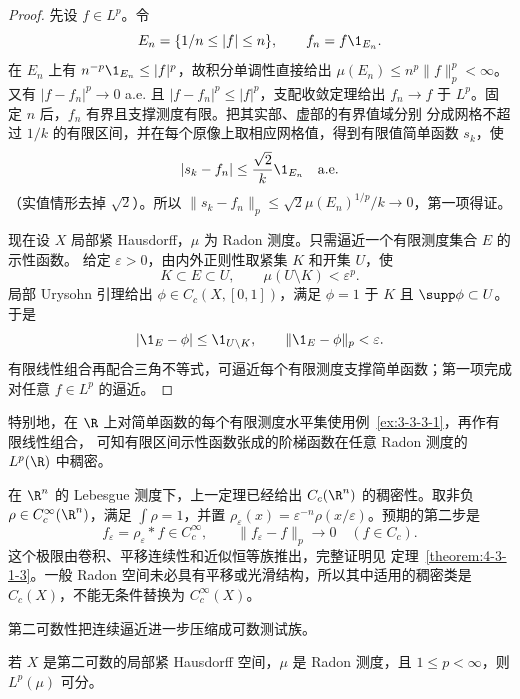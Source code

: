 \begin{proof}
先设 $f\in L^p$。令
\[
  E_n=\{1/n\le|f|\le n\},
  \qquad f_n=f\1_{E_n}.
\]
在 $E_n$ 上有 $n^{-p}\1_{E_n}\le |f|^p$，故积分单调性直接给出
$\mu(E_n)\le n^p\|f\|_p^p<\infty$。又有
$|f-f_n|^p\to0$ a.e. 且 $|f-f_n|^p\le|f|^p$，支配收敛定理给出
$f_n\to f$ 于 $L^p$。固定 $n$ 后，$f_n$ 有界且支撑测度有限。把其实部、虚部的有界值域分别
分成网格不超过 $1/k$ 的有限区间，并在每个原像上取相应网格值，得到有限值简单函数 $s_k$，使
\[
 |s_k-f_n|\le\frac{\sqrt2}{k}\1_{E_n}\quad\text{a.e.}
\]
（实值情形去掉 $\sqrt2$）。所以
$\|s_k-f_n\|_p\le\sqrt2\mu(E_n)^{1/p}/k\to0$，第一项得证。

现在设 $X$ 局部紧 Hausdorff，$\mu$ 为 Radon 测度。只需逼近一个有限测度集合 $E$ 的示性函数。
给定 $\varepsilon>0$，由内外正则性取紧集 $K$ 和开集 $U$，使
\[
  K\subset E\subset U,
  \qquad \mu(U\setminus K)<\varepsilon^p.
\]
局部 Urysohn 引理给出 $\phi\in C_c(X,[0,1])$，满足
$\phi=1$ 于 $K$ 且 $\supp\phi\subset U$。于是
\[
  |\1_E-\phi|\le\1_{U\setminus K},
  \qquad
  \|\1_E-\phi\|_p<\varepsilon.
\]
有限线性组合再配合三角不等式，可逼近每个有限测度支撑简单函数；第一项完成对任意
$f\in L^p$ 的逼近。
\end{proof}

特别地，在 $\R$ 上对简单函数的每个有限测度水平集使用例~\ref{ex:3-3-3-1}，再作有限线性组合，
可知有限区间示性函数张成的阶梯函数在任意 Radon 测度的 $L^p(\R)$ 中稠密。

\begin{example}[欧氏空间中的光滑逼近]\label{ex:3-3-3-2}
在 $\R^n$ 的 Lebesgue 测度下，上一定理已经给出 $C_c(\R^n)$ 的稠密性。取非负
$\rho\in C_c^\infty(\R^n)$，满足 $\int\rho=1$，并置
$\rho_\varepsilon(x)=\varepsilon^{-n}\rho(x/\varepsilon)$。预期的第二步是
\[
  f_\varepsilon=\rho_\varepsilon*f\in C_c^\infty,
  \qquad \|f_\varepsilon-f\|_p\longrightarrow0
  \quad(f\in C_c).
\]
这个极限由卷积、平移连续性和近似恒等族推出，完整证明见
定理~\ref{theorem:4-3-1-3}。一般 Radon 空间未必具有平移或光滑结构，所以其中适用的稠密类是
$C_c(X)$，不能无条件替换为 $C_c^\infty(X)$。
\end{example}

第二可数性把连续逼近进一步压缩成可数测试族。

\begin{proposition}[$L^p$ 可分性]\label{proposition:3-3-3-2}
若 $X$ 是第二可数的局部紧 Hausdorff 空间，$\mu$ 是 Radon 测度，且
$1\le p<\infty$，则 $L^p(\mu)$ 可分。
\end{proposition}

